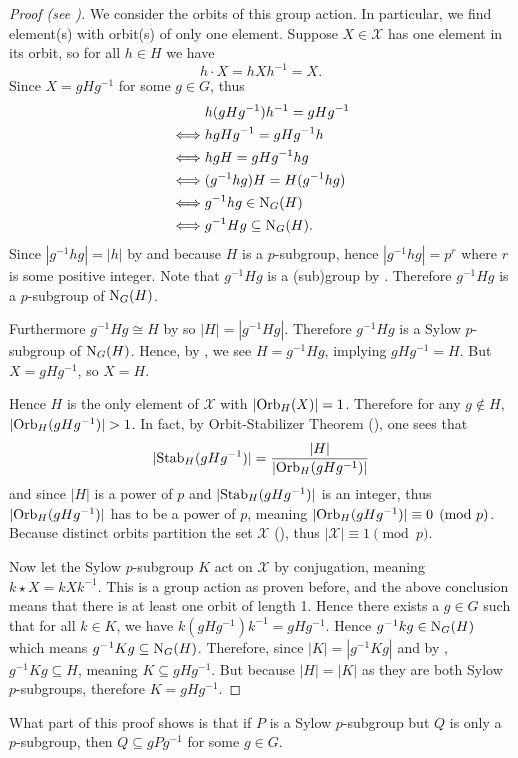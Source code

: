 \begin{proof}[Proof (see {\cite[Theorem 11.10]{humphreys_1996}})]
    We consider the orbits of this group action. In particular, we find element(s) with orbit(s) of only one element. Suppose $X \in \mathcal{X}$ has one element in its orbit, so for all $h \in H$ we have
    \[
        h\cdot X = hXh^{-1} = X.    
    \]
    Since $X = gHg^{-1}$ for some $g \in G$, thus
    \begin{align*}
        &h(gHg^{-1})h^{-1} = gHg^{-1}\\
        \iff&hgHg^{-1} = gHg^{-1}h\\
        \iff&hgH = gHg^{-1}hg\\
        \iff&(g^{-1}hg)H = H(g^{-1}hg)\\
        \iff&g^{-1}hg \in \mathrm{N}_{G}(H)\\
        \iff&g^{-1}Hg \subseteq \mathrm{N}_{G}(H).
    \end{align*}
    Since $|g^{-1}hg| = |h|$ by  and because $H$ is a $p$-subgroup, hence $|g^{-1}hg| = p^r$ where $r$ is some positive integer. Note that $g^{-1}Hg$ is a (sub)group by . Therefore $g^{-1}Hg$ is a $p$-subgroup of $\mathrm{N}_{G}(H)$.
    
    Furthermore $g^{-1}Hg \cong H$ by  so $|H| = |g^{-1}Hg|$. Therefore $g^{-1}Hg$ is a Sylow $p$-subgroup of $\mathrm{N}_{G}(H)$. Hence, by , we see $H = g^{-1}Hg$, implying $gHg^{-1} = H$. But $X = gHg^{-1}$, so $X = H$.
    
    Hence $H$ is the only element of $\mathcal{X}$ with $|\mathrm{Orb}_{H}(X)| = 1$. Therefore for any $g \notin H$, $|\mathrm{Orb}_{H}(gHg^{-1})| > 1$. In fact, by Orbit-Stabilizer Theorem (), one sees that
    \[
        |\mathrm{Stab}_{H}(gHg^{-1})| = \frac{|H|}{|\mathrm{Orb}_{H}(gHg^{-1})|}
    \]
    and since $|H|$ is a power of $p$ and $|\mathrm{Stab}_{H}(gHg^{-1})|$ is an integer, thus $|\mathrm{Orb}_{H}(gHg^{-1})|$ has to be a power of $p$, meaning $|\mathrm{Orb}_{H}(gHg^{-1})| \equiv 0 \pmod p$. Because distinct orbits partition the set $\mathcal{X}$ (), thus $|\mathcal{X}| \equiv 1 \pmod p$.

    Now let the Sylow $p$-subgroup $K$ act on $\mathcal{X}$ by conjugation, meaning $k \star X = kXk^{-1}$. This is a group action as proven before, and the above conclusion means that there is at least one orbit of length 1. Hence there exists a $g \in G$ such that for all $k \in K$, we have $k(gHg^{-1})k^{-1} = gHg^{-1}$. Hence $g^{-1}kg \in \mathrm{N}_{G}(H)$ which means $g^{-1}Kg \subseteq \mathrm{N}_{G}(H)$. Therefore, since $|K| = |g^{-1}Kg|$ and by , $g^{-1}Kg \subseteq H$, meaning $K \subseteq gHg^{-1}$. But because $|H| = |K|$ as they are both Sylow $p$-subgroups, therefore $K = gHg^{-1}$.
\end{proof}
\begin{remark}
    What part of this proof shows is that if $P$ is a Sylow $p$-subgroup but $Q$ is only a $p$-subgroup, then $Q \subseteq gPg^{-1}$ for some $g \in G$.
\end{remark}

